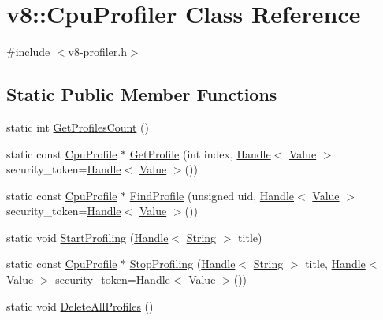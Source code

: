 \hypertarget{classv8_1_1_cpu_profiler}{}\section{v8\+:\+:Cpu\+Profiler Class Reference}
\label{classv8_1_1_cpu_profiler}


{\ttfamily \#include $<$v8-\/profiler.\+h$>$}

\subsection*{Static Public Member Functions}
\begin{DoxyCompactItemize}
\item 
static int \hyperlink{classv8_1_1_cpu_profiler_a44a4ffe2e95237dfeb892972d14d344e}{Get\+Profiles\+Count} ()
\item 
static const \hyperlink{classv8_1_1_cpu_profile}{Cpu\+Profile} $\ast$ \hyperlink{classv8_1_1_cpu_profiler_aca7acdfb0f9a4e7744638dddf97d5ada}{Get\+Profile} (int index, \hyperlink{classv8_1_1_handle}{Handle}$<$ \hyperlink{classv8_1_1_value}{Value} $>$ security\+\_\+token=\hyperlink{classv8_1_1_handle}{Handle}$<$ \hyperlink{classv8_1_1_value}{Value} $>$())
\item 
static const \hyperlink{classv8_1_1_cpu_profile}{Cpu\+Profile} $\ast$ \hyperlink{classv8_1_1_cpu_profiler_a8165ab53a0d9669757e64efd80d4f5d0}{Find\+Profile} (unsigned uid, \hyperlink{classv8_1_1_handle}{Handle}$<$ \hyperlink{classv8_1_1_value}{Value} $>$ security\+\_\+token=\hyperlink{classv8_1_1_handle}{Handle}$<$ \hyperlink{classv8_1_1_value}{Value} $>$())
\item 
static void \hyperlink{classv8_1_1_cpu_profiler_a04c07069ea985ee67a9bcd7a97ab17fc}{Start\+Profiling} (\hyperlink{classv8_1_1_handle}{Handle}$<$ \hyperlink{classv8_1_1_string}{String} $>$ title)
\item 
static const \hyperlink{classv8_1_1_cpu_profile}{Cpu\+Profile} $\ast$ \hyperlink{classv8_1_1_cpu_profiler_ac2702be592e9218e6584f562a9ad7dd8}{Stop\+Profiling} (\hyperlink{classv8_1_1_handle}{Handle}$<$ \hyperlink{classv8_1_1_string}{String} $>$ title, \hyperlink{classv8_1_1_handle}{Handle}$<$ \hyperlink{classv8_1_1_value}{Value} $>$ security\+\_\+token=\hyperlink{classv8_1_1_handle}{Handle}$<$ \hyperlink{classv8_1_1_value}{Value} $>$())
\item 
static void \hyperlink{classv8_1_1_cpu_profiler_a78bd6f781ff00c0ff1f88870608369c5}{Delete\+All\+Profiles} ()
\end{DoxyCompactItemize}


